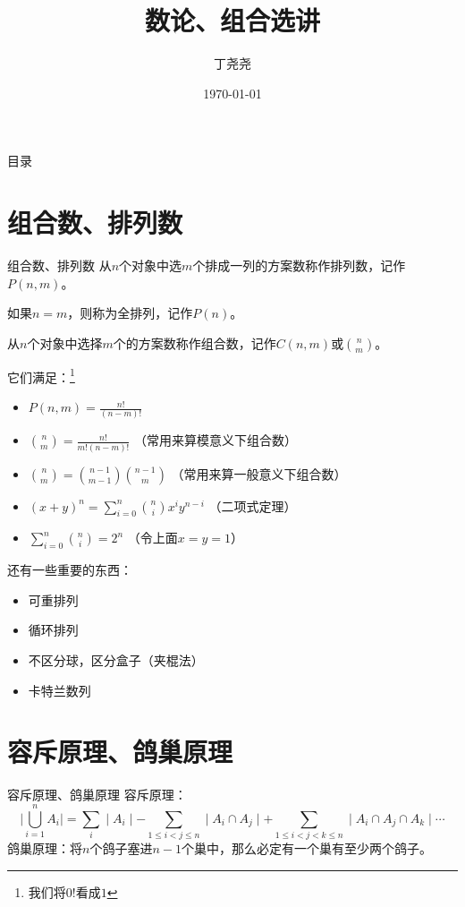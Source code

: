 \documentclass[9pt]{beamer}
\author{丁尧尧}
\title{数论、组合选讲}
\institute{上海交通大学}
\date{\today}
\begin{document}
	\maketitle
	
	\begin{frame}{目录}
		\begin{multicols}{2}
			\tableofcontents
		\end{multicols}
	\end{frame}
	\section{组合数、排列数} 
	\begin{frame}{组合数、排列数} 
		从$ n $个对象中选$m$个排成一列的方案数称作排列数，记作$ P(n,m) $。
		
		如果$n=m$，则称为全排列，记作$ P(n) $。
		
		从$ n $个对象中选择$ m $个的方案数称作组合数，记作$ C(n,m) $或$\binom{n}{m}$。
		
		它们满足：\footnote{我们将$0!$看成$1$}
		
		\begin{itemize}
			\item $ P(n,m) = \frac{n!}{(n-m)!} $
			\item $ \binom{n}{m} = \frac{n!}{m!(n-m)!} $  （常用来算模意义下组合数）
			\item $ \binom{n}{m} = \binom{n-1}{m-1}\binom{n-1}{m} $ （常用来算一般意义下组合数）
			\item $(x+y)^n = \sum_{i=0}^{n}\binom{n}{i}x^iy^{n-i} $ （二项式定理）
			\item $ \sum_{i=0}^{n}\binom{n}{i} = 2^n $ （令上面$x = y = 1$）
		\end{itemize}
		
		还有一些重要的东西：
		\begin{itemize}
			\item 可重排列
			\item 循环排列
			\item 不区分球，区分盒子（夹棍法）
			\item 卡特兰数列
		\end{itemize}
	\end{frame}
	\section{容斥原理、鸽巢原理} 
		\begin{frame}{容斥原理、鸽巢原理} 
			容斥原理：
			$$
				\mid \bigcup_{i = 1}^{n} A_i\mid = \sum_{i} \mid  A_i \mid - \sum_{1 \leq i < j \leq n} \mid A_i \cap A_j \mid + \sum_{1 \leq i < j < k \leq n} \mid A_i \cap A_j \cap A_k \mid \cdots 
			$$
			鸽巢原理：将$n$个鸽子塞进$n-1$个巢中，那么必定有一个巢有至少两个鸽子。
		\end{frame}
\end{document}
